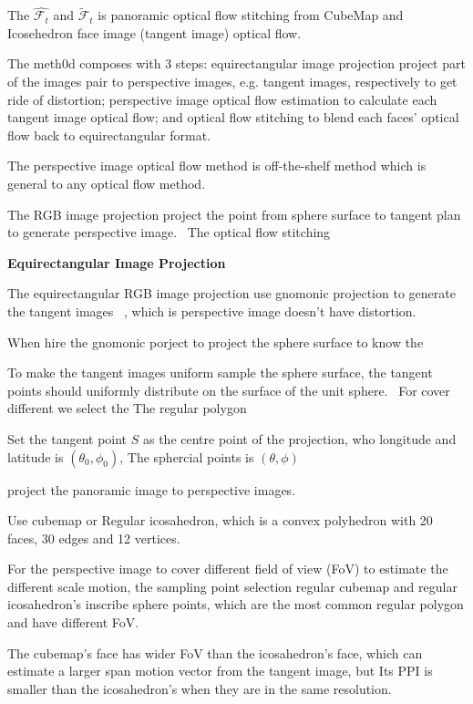 The $\hat{\mathcal{F}_t}$ and $\tilde{\mathcal{F}}_t$ is panoramic optical flow stitching from CubeMap and Icosehedron face image (tangent image) optical flow.

The meth0d composes with 3 steps:
 equirectangular image projection project part of the images pair to perspective images, e.g. tangent images, respectively to get ride of distortion;
 perspective image optical flow estimation to calculate each tangent image optical flow;
 and optical flow stitching to blend each faces' optical flow back to equirectangular format. 
 
 The perspective image optical flow method is off-the-shelf method which is general to any optical flow method.

The RGB image projection project the point from sphere surface to tangent plan to generate perspective image.~\cite{??}
The optical flow stitching 

\textbf{Equirectangular Image Projection}


The equirectangular RGB image projection use gnomonic projection to generate the tangent images ~\cite{??}, which is perspective image doesn't have distortion.

When hire the gnomonic porject to project the sphere surface to know the 

To make the tangent images uniform sample the sphere surface, the tangent points should uniformly distribute on the surface of the unit sphere.~\cite{??}
For cover different we select the 
The regular polygon ~\cite{??} 


Set the tangent point $S$ as the centre point of the projection, who longitude and latitude is $(\theta_0, \phi_0)$,
The sphercial points is $(\theta, \phi)$

project the panoramic image to perspective images.

Use cubemap or Regular icosahedron, which is a convex polyhedron with 20 faces, 30 edges and 12 vertices.

For the perspective image to cover different field of view (FoV)  to estimate the different scale motion, the sampling point selection regular cubemap and regular icosahedron's inscribe sphere points, which are the most common regular polygon and have different FoV. ~\cite{xxx}

The cubemap's face has wider FoV than the icosahedron's face, which can estimate a larger span motion vector from the tangent image, but Its PPI is smaller than the icosahedron's when they are in the same resolution.

